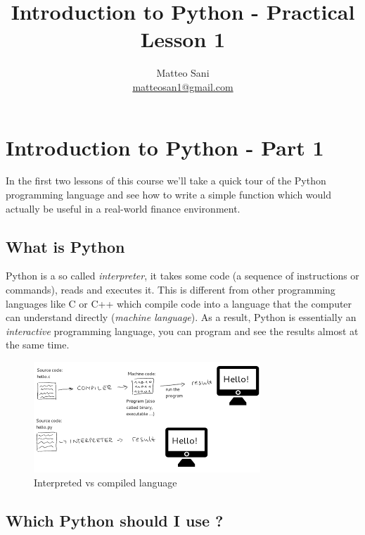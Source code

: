 \documentclass[11pt]{article}
\title{Introduction to Python - Practical Lesson 1}
\author{Matteo Sani \\ \href{mailto:matteosan1@gmail.com}{matteosan1@gmail.com}}
\makeatletter
\def\maxwidth{\ifdim\Gin@nat@width>\linewidth\linewidth
    \else\Gin@nat@width\fi}
\let\Oldincludegraphics\includegraphics
\renewcommand{\includegraphics}[1]{\Oldincludegraphics[width=.8\maxwidth]{#1}}
\makeatother
\begin{document}
    
    
    \maketitle
    
    

    
    \hypertarget{introduction-to-python---lesson-1}{%
\section{Introduction to Python - Part 1}\label{introduction-to-python---lesson-1}}

In the first two lessons of this course we'll take a quick tour of the
Python programming language and see how to write a simple function which
would actually be useful in a real-world finance environment.

\hypertarget{what-is-python}{%
\subsection{What is Python}\label{what-is-python}}

Python is a so called \emph{interpreter}, it takes some code (a sequence
of instructions or commands), reads and executes it. This is different
from other programming languages like C or C++ which compile code into a
language that the computer can understand directly (\emph{machine
language}). As a result, Python is essentially an \emph{interactive}
programming language, you can program and see the results almost at the
same time.

\begin{figure}
\centering
\includegraphics{index.png}
\caption{Interpreted vs compiled language}
\end{figure}

\hypertarget{which-python-should-i-use}{%
\subsection{Which Python should I use
?}\label{which-python-should-i-use}}
\end{document}
